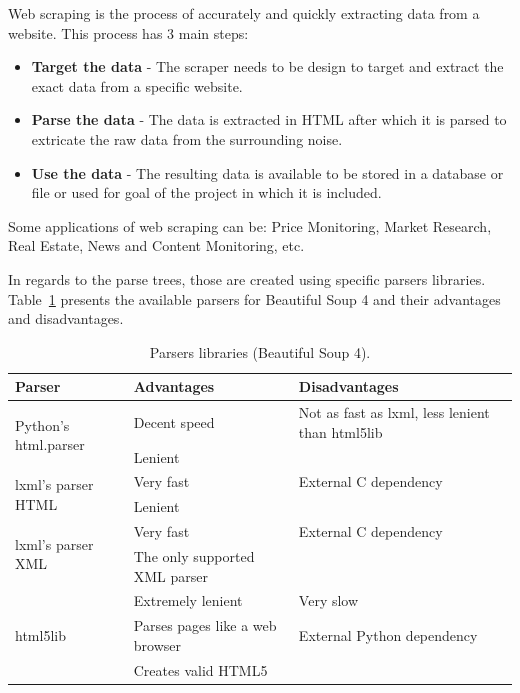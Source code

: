 Web scraping is the process of accurately and quickly extracting data from a website.
This process has 3 main steps:
\begin{itemize}
    \item \textbf{Target the data} - The scraper needs to be design to target and extract the exact data from a specific website.
    \item \textbf{Parse the data} - The data is extracted in HTML after which it is parsed to extricate the raw data from the surrounding noise.
    \item \textbf{Use the data} - The resulting data is available to be stored in a database or file or used for goal of the project in which it is included.
\end{itemize}
Some applications of web scraping can be: Price Monitoring, Market Research, Real Estate, News and Content Monitoring, etc.

In regards to the parse trees, those are created using specific parsers libraries.
Table~\ref{table:parsebs4} presents the available parsers for Beautiful Soup 4 and their advantages and disadvantages\cite{bs42020Docs}.

\begin{table}[H]
    \centering
    \caption{Parsers libraries (Beautiful Soup 4).}
    \label{table:parsebs4}
    \begin{tabular}{l|l|p{5cm}}
        Parser & Advantages & Disadvantages\\
        \hline
        \multirow {2}{*}{Python's html.parser} & {Decent speed} & {Not as fast as lxml, less lenient than html5lib} \\
        & {Lenient} & {} \\
        \hline
        \multirow {2}{*}{lxml's parser HTML} & {Very fast} & {External C dependency} \\
        & {Lenient} & {} \\
        \hline
        \multirow {2}{*}{lxml's parser XML} & {Very fast} & {External C dependency} \\
        & {The only supported XML parser} & {} \\
        \hline
        \multirow {3}{*}{html5lib} & {Extremely lenient} & {Very slow} \\
        & {Parses pages like a web browser} & {External Python dependency} \\
        & {Creates valid HTML5} & {} \\
        \hline
    \end{tabular}
\end{table}

